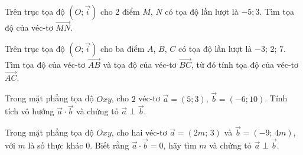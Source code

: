 \begin{bt}%
Trên trục tọa độ $\left(O;\overrightarrow{i}\right)$ cho 2 điểm $M$, $N$ có tọa độ lần lượt là $-5; 3$. Tìm tọa độ của véc-tơ $\overrightarrow{MN}$.
\end{bt}

\begin{bt}%
	Trên trục tọa độ $\left(O;\overrightarrow{i}\right)$ cho ba điểm $A$, $B$, $C$ có tọa độ lần lượt là $-3;\, 2;\, 7$. Tìm tọa độ của véc-tơ $\overrightarrow{AB}$ và tọa độ của véc-tơ $\overrightarrow{BC}$, từ đó tính tọa độ của véc-tơ $\overrightarrow{AC}$.
\end{bt}

\begin{bt}%
	Trong mặt phẳng tọa độ $Oxy$, cho $2$ véc-tơ $\overrightarrow{a}=(5;3)$, $\overrightarrow{b}=(-6;10)$. Tính tích vô hướng $\overrightarrow{a}\cdot \overrightarrow{b}$ và chứng tỏ $\overrightarrow{a}\perp\overrightarrow{b}$.
\end{bt}

\begin{bt}%
	Trong mặt phẳng tọa độ $Oxy$, cho hai véc-tơ $\overrightarrow{a}=(2m;\,3)$ và $\overrightarrow{b}=(-9;\,4m)$, với $m$ là số thực khác $0$. Biết rằng $\overrightarrow{a}\cdot\overrightarrow{b}=0$, hãy tìm $m$ và chứng tỏ $\overrightarrow{a}\perp\overrightarrow{b}$.
\end{bt}

